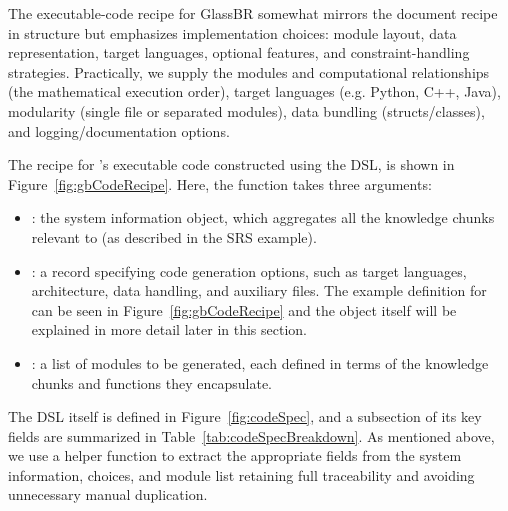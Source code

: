 The executable-code recipe for GlassBR somewhat mirrors the document recipe in 
structure but emphasizes implementation choices: module layout, data 
representation, target languages, optional features, and constraint-handling 
strategies. Practically, we supply the modules and computational relationships 
(the mathematical execution order), target languages (e.g. Python, C++, Java), 
modularity (single file or separated modules), data bundling (structs/classes), 
and logging/documentation options. 

The recipe for \gb{}'s executable code constructed using the 
 DSL, is shown in Figure~\ref{fig:gbCodeRecipe}. 
Here, the  function takes three arguments:
\begin{itemize}
\item {}: the system information object, which aggregates all the 
knowledge chunks relevant to \gb{} (as described in the SRS example).
\item {}: a record specifying code generation options, such as 
target languages, architecture, data handling, and auxiliary files. The example 
 definition for \gb{} can be seen in 
Figure~\ref{fig:gbCodeRecipe} and the object itself will be explained in more 
detail later in this section.
\item {}: a list of modules to be generated, each defined in terms 
of the knowledge chunks and functions they encapsulate.
\end{itemize}



The  DSL itself is defined in Figure~\ref{fig:codeSpec}, and 
a subsection of its key fields are summarized in 
Table~\ref{tab:codeSpecBreakdown}. As mentioned above, we use a helper function 
 to extract the appropriate fields from the system information, 
choices, and module list retaining full traceability and avoiding unnecessary 
manual duplication.

